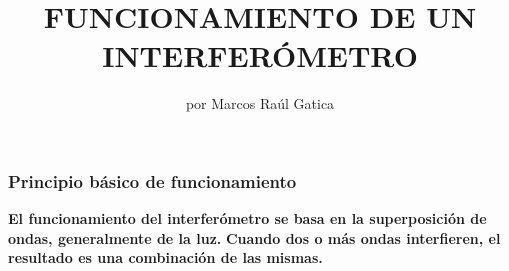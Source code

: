 \documentclass{beamer}
\title{FUNCIONAMIENTO DE UN INTERFERÓMETRO}
\author{por Marcos Raúl Gatica}
\date{}
\begin{document}
\begin{frame}[plain]
    \maketitle
\end{frame}
\begin{frame}
    \frametitle{Principio básico de funcionamiento}
    \textbf{
     El funcionamiento del interferómetro se basa en la superposición de ondas, generalmente de la luz.
    }
    \newline
    \textbf{
    Cuando dos o más ondas interfieren, el resultado es una combinación de las mismas.
    }
\end{frame}
\end{document}
